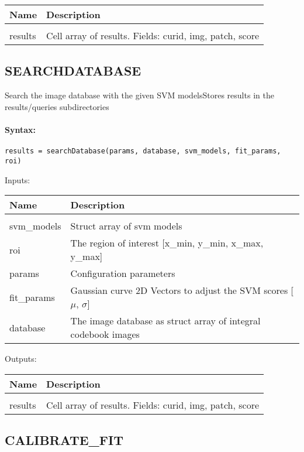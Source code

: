 \begin{tabular}{|l|p{5cm}|}
\hline
\textbf{Name} & \textbf{Description} \\
\hline \hline \\
results & Cell array of results. Fields: curid, img, patch, score  \\ \hline
\end{tabular}

\subsection{SEARCHDATABASE}

Search the image database with the given SVM modelsStores results in the results/queries subdirectories

\paragraph{Syntax:} \verb|results = searchDatabase(params, database, svm_models, fit_params, roi)|

Inputs:

\begin{tabular}{|l|p{5cm}|}
\hline
\textbf{Name} & \textbf{Description} \\
\hline \hline \\
svm\_models & Struct array of svm models  \\ \hline
roi & The region of interest [x\_{min}, y\_{min}, x\_{max}, y\_{max}]  \\ \hline
params & Configuration parameters  \\ \hline
fit\_params & Gaussian curve 2D Vectors to adjust the SVM scores [$\mu$, $\sigma$]  \\ \hline
database & The image database as struct array of integral codebook images  \\ \hline
\end{tabular}
Outputs:

\begin{tabular}{|l|p{5cm}|}
\hline
\textbf{Name} & \textbf{Description} \\
\hline \hline \\
results & Cell array of results. Fields: curid, img, patch, score  \\ \hline
\end{tabular}

\subsection{CALIBRATE\_FIT}

